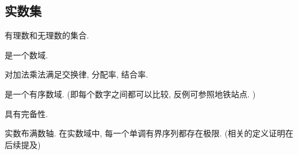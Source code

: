 \subsection{实数集}

\begin{definition}[实数集的定义]
    有理数和无理数的集合. 
\end{definition}

\begin{definition}[实数性质]
    \item 是一个数域. 
    \item 对加法乘法满足交换律, 分配率, 结合率. 
    \item 是一个有序数域. (即每个数字之间都可以比较, 反例可参照地铁站点. )
    \item 具有完备性. 
\end{definition}

\begin{definition}[实数的完备性]
    实数布满数轴. 
    在实数域中, 每一个单调有界序列都存在极限. (相关的定义证明在后续提及)
\end{definition}

